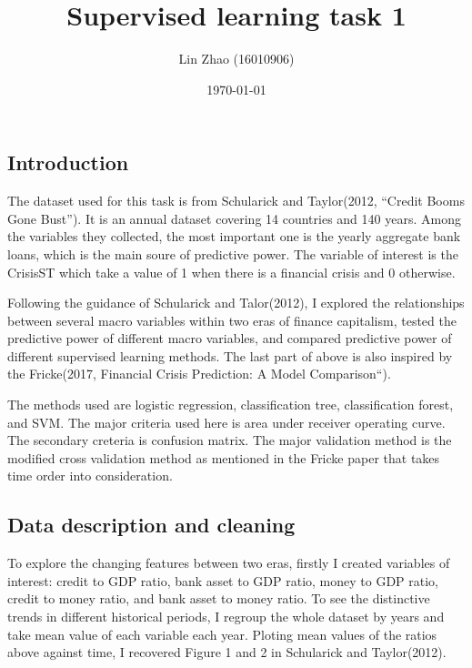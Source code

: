 \documentclass{article}
\begin{document}
\title{Supervised learning task 1}
\author{Lin Zhao (16010906)}
\date{\today}
\maketitle

\newpage

\subsection*{Introduction}

The dataset used for this task is from Schularick and Taylor(2012,
``Credit Booms Gone Bust''). It is an annual dataset covering 14
countries and 140 years. Among the variables they collected, the most
important one is the yearly aggregate bank loans, which is 
the main soure of predictive power. The variable of interest is the
CrisisST which take a value of 1 when there is a financial crisis and 0
otherwise.

Following the guidance of Schularick and Talor(2012), I explored the
relationships between several macro variables within two
eras of finance capitalism, tested the predictive power of different
macro variables, and compared predictive power of different supervised
learning methods. The last part of above is also inspired by the
Fricke(2017, Financial Crisis Prediction: A Model Comparison``). 

The methods used are logistic regression, classification
tree, classification forest, and SVM. The major criteria
used here is area under receiver operating curve. The secondary creteria
is confusion matrix. The major validation method is the modified cross
validation method  as mentioned in the Fricke paper that takes time order into
consideration.

\subsection*{Data description and cleaning}

To explore the changing features between two eras, firstly I created
variables of interest: credit to GDP ratio, bank asset to GDP ratio,
money to GDP ratio, credit to money ratio, and bank asset to money
ratio. To see the distinctive trends in different historical periods, I
regroup the whole dataset by years and take mean value of each variable
each year. Ploting mean values of the ratios above against time, I
recovered Figure 1 and 2 in Schularick and Taylor(2012).
\end{document}

